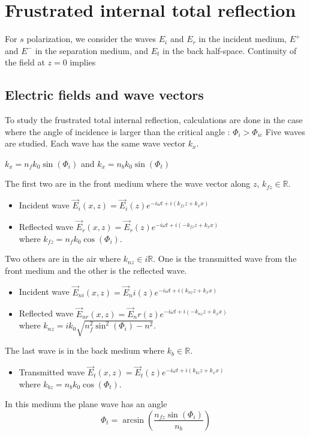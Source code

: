 \section{Frustrated internal total reflection}

For $s$ polarization, we consider the waves $E_i$ and $E_r$ in the incident medium, $E^+$ and $E^-$ in the separation medium, and $E_t$ in the back half-space.
Continuity of the field at $z=0$ implies


\subsection{Electric fields and wave vectors}
To study the frustrated total internal reflection, calculations are done in the case where the angle of incidence is larger than the critical angle :
$\Phi_i > \Phi_{ic}$
Five waves are studied. Each wave has the same wave vector $k_x$.
\begin{center}
$k_x=n_fk_0\sin(\Phi_i)$ and $k_x=n_bk_0\sin(\Phi_t)$\\
\end{center}

The first two are in the front medium where the wave vector along $z$, $k_{fz}\in \mathbb{R}$.
\begin{itemize}
\item  Incident wave  $\vec{E}_i(x,z)=\vec{E}_i(z)e^{-i\omega t+i(k_{fz}z+k_xx)}$
\item Reflected wave  $\vec{E}_r(x,z)=\vec{E}_r(z)e^{-i\omega t+i(-k_{fz}z+k_xx)}$\\
where $k_{fz}=n_fk_0\cos(\Phi _i)$.
\end{itemize}
Two others are in the air where $k_{nz}\in i\mathbb{R}$. One is the transmitted wave from the front medium and the other is the reflected wave.
\begin{itemize}
\item Incident wave 
$\vec{E}_{ni}(x,z)=\vec{E}_ni(z)e^{-i\omega t+i(k_{nz}z+k_xx)}$
\item Reflected wave 
$\vec{E}_{nr}(x,z)=\vec{E}_nr(z)e^{-i\omega t+i(-k_{nz}z+k_xx)}$\\
where $k_{nz}=ik_0\sqrt{n_f^2\sin^2(\Phi _i)-n^2}$.
\end{itemize}
The last wave is in the back medium where $k_{b}\in \mathbb{R}$.
\begin{itemize}
\item Transmitted wave
$\vec{E}_t(x,z)=\vec{E}_t(z)e^{-i\omega t+i(k_{bz}z+k_xx)}$\\
where $k_{bz}=n_bk_0\cos(\Phi _t)$.
\end{itemize}
In this medium the plane wave has an angle \\
$$
\Phi_t=\arcsin (\frac{n_{fz}\sin(\Phi_i)}{n_b})
$$

